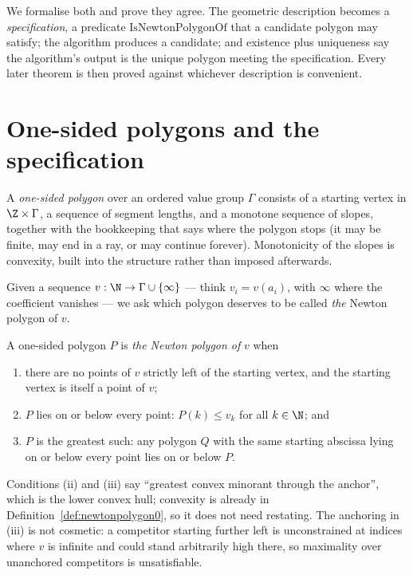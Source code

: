We formalise both and prove they agree.  The geometric description becomes a
\emph{specification}, a predicate $\mathrm{IsNewtonPolygonOf}$ that a candidate polygon may
satisfy; the algorithm produces a candidate; and existence plus uniqueness say the algorithm's
output is the unique polygon meeting the specification.  Every later theorem is then proved
against whichever description is convenient.

\section{One-sided polygons and the specification}

\begin{definition}
  \label{def:newtonpolygon0}
  \leanok
  A \emph{one-sided polygon} over an ordered value group $\Gamma$ consists of a starting vertex
  in $\Z \times \Gamma$, a sequence of segment lengths, and a monotone sequence of slopes,
  together with the bookkeeping that says where the polygon stops (it may be finite, may end in a
  ray, or may continue forever).  Monotonicity of the slopes is convexity, built into the
  structure rather than imposed afterwards.
\end{definition}

Given a sequence $v : \N \to \Gamma \cup \{\infty\}$ — think $v_i = v(a_i)$, with $\infty$ where
the coefficient vanishes — we ask which polygon deserves to be called \emph{the} Newton polygon of
$v$.

\begin{definition}
  \label{def:isnewtonpolygonof}
  \leanok
  A one-sided polygon $P$ is \emph{the Newton polygon of} $v$ when
  \begin{enumerate}
    \item there are no points of $v$ strictly left of the starting vertex, and the starting
      vertex is itself a point of $v$;
    \item $P$ lies on or below every point: $P(k) \leq v_k$ for all $k \in \N$; and
    \item $P$ is the greatest such: any polygon $Q$ with the same starting abscissa lying on or
      below every point lies on or below $P$.
  \end{enumerate}
\end{definition}

Conditions (ii) and (iii) say ``greatest convex minorant through the anchor'', which is the lower
convex hull; convexity is already in Definition~\ref{def:newtonpolygon0}, so it does not need
restating.  The anchoring in (iii) is not cosmetic: a competitor starting further left is
unconstrained at indices where $v$ is infinite and could stand arbitrarily high there, so
maximality over unanchored competitors is unsatisfiable.

